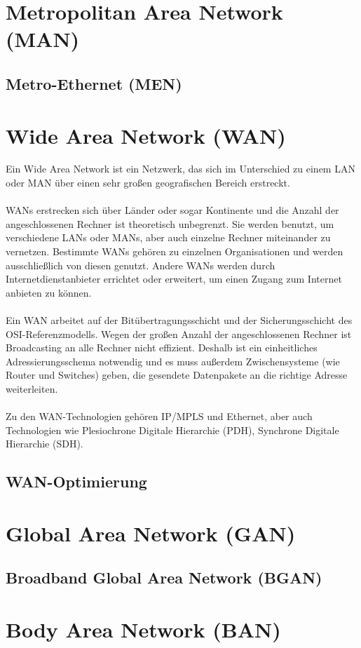 \documentclass[a4paper,14pt]{scrreprt}
\begin{document}
\chapter{Metropolitan Area Network (MAN)}
\section{Metro-Ethernet (MEN)}

\chapter{Wide Area Network (WAN)}
Ein Wide Area Network ist ein Netzwerk, das sich im Unterschied zu einem LAN oder MAN über einen sehr großen geografischen Bereich erstreckt.\\\\WANs erstrecken sich über Länder oder sogar Kontinente und die Anzahl der angeschlossenen Rechner ist theoretisch unbegrenzt. Sie werden benutzt, um verschiedene LANs oder MANs, aber auch einzelne Rechner miteinander zu vernetzen. Bestimmte WANs gehören zu einzelnen Organisationen und werden ausschließlich von diesen genutzt. Andere WANs werden durch Internetdienstanbieter errichtet oder erweitert, um einen Zugang zum Internet anbieten zu können.\\\\Ein WAN arbeitet auf der Bitübertragungsschicht und der Sicherungsschicht des OSI-Referenzmodells. Wegen der großen Anzahl der angeschlossenen Rechner ist Broadcasting an alle Rechner nicht effizient. Deshalb ist ein einheitliches Adressierungsschema notwendig und es muss außerdem Zwischensysteme (wie Router und Switches) geben, die gesendete Datenpakete an die richtige Adresse weiterleiten. \\\\Zu den WAN-Technologien gehören IP/MPLS und Ethernet, aber auch Technologien wie Plesiochrone Digitale Hierarchie (PDH), Synchrone Digitale Hierarchie (SDH).
\section{WAN-Optimierung}
\chapter{Global Area Network (GAN)}
\section{Broadband Global Area Network (BGAN)}
\chapter{Body Area Network (BAN)}
\end{document}
